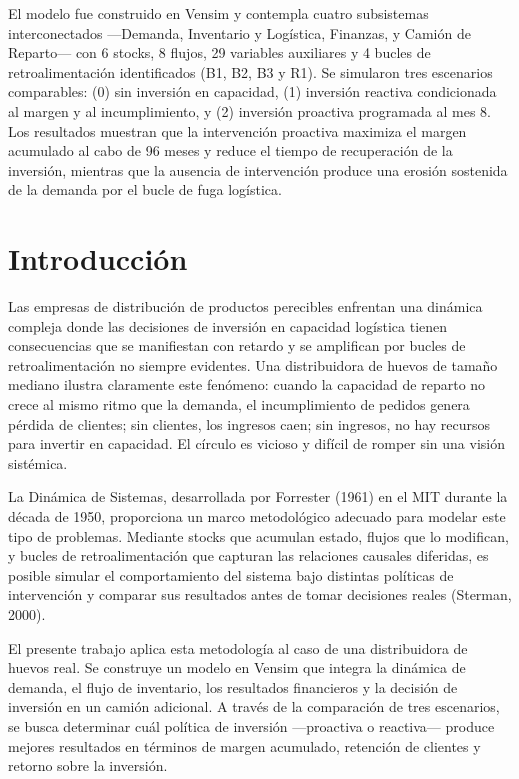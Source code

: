 \documentclass[10pt,a4paper]{article}
\begin{document}
El modelo fue construido en Vensim y contempla cuatro subsistemas interconectados ---Demanda, Inventario y Logística, Finanzas, y Camión de Reparto--- con 6 stocks, 8 flujos, 29 variables auxiliares y 4 bucles de retroalimentación identificados (B1, B2, B3 y R1). Se simularon tres escenarios comparables: (0) sin inversión en capacidad, (1) inversión reactiva condicionada al margen y al incumplimiento, y (2) inversión proactiva programada al mes 8. Los resultados muestran que la intervención proactiva maximiza el margen acumulado al cabo de 96 meses y reduce el tiempo de recuperación de la inversión, mientras que la ausencia de intervención produce una erosión sostenida de la demanda por el bucle de fuga logística.

\newpage

\section{Introducción}

Las empresas de distribución de productos perecibles enfrentan una dinámica compleja donde las decisiones de inversión en capacidad logística tienen consecuencias que se manifiestan con retardo y se amplifican por bucles de retroalimentación no siempre evidentes. Una distribuidora de huevos de tamaño mediano ilustra claramente este fenómeno: cuando la capacidad de reparto no crece al mismo ritmo que la demanda, el incumplimiento de pedidos genera pérdida de clientes; sin clientes, los ingresos caen; sin ingresos, no hay recursos para invertir en capacidad. El círculo es vicioso y difícil de romper sin una visión sistémica.

La Dinámica de Sistemas, desarrollada por Forrester (1961) en el MIT durante la década de 1950, proporciona un marco metodológico adecuado para modelar este tipo de problemas. Mediante stocks que acumulan estado, flujos que lo modifican, y bucles de retroalimentación que capturan las relaciones causales diferidas, es posible simular el comportamiento del sistema bajo distintas políticas de intervención y comparar sus resultados antes de tomar decisiones reales (Sterman, 2000).

El presente trabajo aplica esta metodología al caso de una distribuidora de huevos real. Se construye un modelo en Vensim que integra la dinámica de demanda, el flujo de inventario, los resultados financieros y la decisión de inversión en un camión adicional. A través de la comparación de tres escenarios, se busca determinar cuál política de inversión ---proactiva o reactiva--- produce mejores resultados en términos de margen acumulado, retención de clientes y retorno sobre la inversión.
\end{document}
